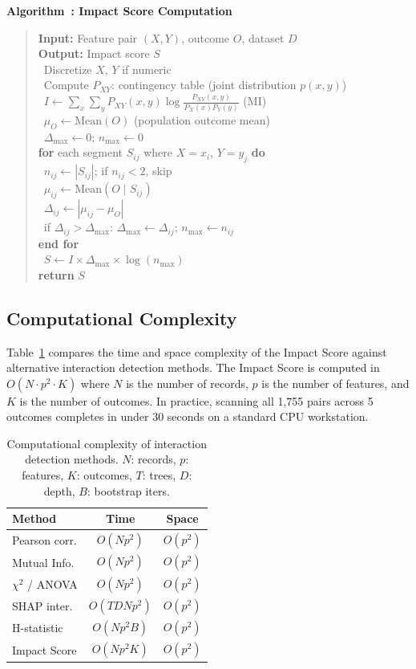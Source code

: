 \documentclass[conference]{IEEEtran}
\newcounter{algorithm}
\newenvironment{algorithm}[1][]
  {\refstepcounter{algorithm}\par\medskip\noindent\textbf{Algorithm~\thealgorithm: #1}\par\smallskip\begin{quote}}
  {\end{quote}\par\medskip}
\newcommand{\algorithminput}[1]{\textbf{Input:} #1\\}
\newcommand{\algorithmoutput}[1]{\textbf{Output:} #1\\}
\newcommand{\algorithmstep}[1]{\textbullet~#1\\}
\newcommand{\algorithmfor}[1]{\textbf{for} #1 \textbf{do}\\}
\newcommand{\algorithmendfor}{\textbf{end for}\\}
\newcommand{\algorithmreturn}[1]{\textbf{return} #1\\}
\begin{document}
\begin{algorithm}[Impact Score Computation]\label{alg:impact}
\algorithminput{Feature pair $(X,Y)$, outcome $O$, dataset $D$}
\algorithmoutput{Impact score $S$}
\algorithmstep{Discretize $X$, $Y$ if numeric}
\algorithmstep{Compute $P_{XY}$: contingency table (joint distribution $p(x,y)$)}
\algorithmstep{$I \gets \sum_x\sum_y P_{XY}(x,y)\log\frac{P_{XY}(x,y)}{P_X(x)P_Y(y)}$ (MI)}
\algorithmstep{$\mu_O \gets \text{Mean}(O)$ (population outcome mean)}
\algorithmstep{$\Delta_{\max} \gets 0$; $n_{\max} \gets 0$}
\algorithmfor{each segment $S_{ij}$ where $X=x_i$, $Y=y_j$}
\algorithmstep{$n_{ij} \gets |S_{ij}|$; if $n_{ij} < 2$, skip}
\algorithmstep{$\mu_{ij} \gets \text{Mean}(O \mid S_{ij})$}
\algorithmstep{$\Delta_{ij} \gets |\mu_{ij} - \mu_O|$}
\algorithmstep{if $\Delta_{ij} > \Delta_{\max}$: $\Delta_{\max} \gets \Delta_{ij}$; $n_{\max} \gets n_{ij}$}
\algorithmendfor
\algorithmstep{$S \gets I \times \Delta_{\max} \times \log(n_{\max})$}
\algorithmreturn{$S$}
\end{algorithm}

\subsection{Computational Complexity}
\label{sec:complexity}

Table~\ref{tab:complexity} compares the time and space complexity of the Impact Score against alternative interaction detection methods. The Impact Score is computed in $O(N \cdot p^2 \cdot K)$ where $N$ is the number of records, $p$ is the number of features, and $K$ is the number of outcomes. In practice, scanning all 1,755 pairs across 5 outcomes completes in under 30 seconds on a standard CPU workstation.

\begin{table}[htb]
\centering
\small
\renewcommand{\arraystretch}{1.15}
\caption{Computational complexity of interaction detection methods. $N$: records, $p$: features, $K$: outcomes, $T$: trees, $D$: depth, $B$: bootstrap iters.}
\label{tab:complexity}
\begin{tabular}{lcc}
\hline
Method & Time & Space \\
\hline
Pearson corr. & $O(N p^2)$ & $O(p^2)$ \\
Mutual Info. & $O(N p^2)$ & $O(p^2)$ \\
$\chi^2$ / ANOVA & $O(N p^2)$ & $O(p^2)$ \\
SHAP inter. \cite{lundberg2020shap} & $O(T D N p^2)$ & $O(p^2)$ \\
H-statistic \cite{friedman2008predictive} & $O(N p^2 B)$ & $O(p^2)$ \\
Impact Score & $O(N p^2 K)$ & $O(p^2)$ \\
\hline
\end{tabular}
\end{table}
\end{document}
